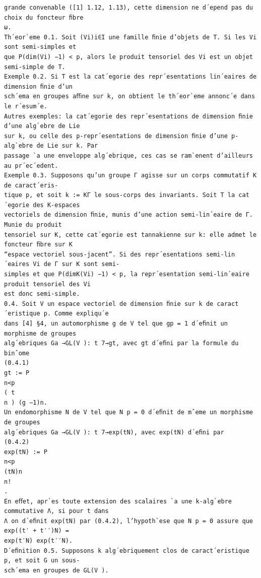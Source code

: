 \documentclass[10pt]{article}
\begin{document}
\begin{verbatim}
grande convenable ([1] 1.12, 1.13), cette dimension ne d´epend pas du choix du foncteur ﬁbre
ω.
Th´eor`eme 0.1. Soit (Vi)i∈I une famille ﬁnie d’objets de T. Si les Vi sont semi-simples et
que P(dim(Vi) −1) < p, alors le produit tensoriel des Vi est un objet semi-simple de T.
Exemple 0.2. Si T est la cat´egorie des repr´esentations lin´eaires de dimension ﬁnie d’un
sch´ema en groupes aﬃne sur k, on obtient le th´eor`eme annonc´e dans le r´esum´e.
Autres exemples: la cat´egorie des repr´esentations de dimension ﬁnie d’une alg`ebre de Lie
sur k, ou celle des p-repr´esentations de dimension ﬁnie d’une p-alg`ebre de Lie sur k. Par
passage `a une enveloppe alg´ebrique, ces cas se ram`enent d’ailleurs au pr´ec´edent.
Exemple 0.3. Supposons qu’un groupe Γ agisse sur un corps commutatif K de caract´eris-
tique p, et soit k := KΓ le sous-corps des invariants. Soit T la cat´egorie des K-espaces
vectoriels de dimension ﬁnie, munis d’une action semi-lin´eaire de Γ.
Munie du produit
tensoriel sur K, cette cat´egorie est tannakienne sur k: elle admet le foncteur ﬁbre sur K
“espace vectoriel sous-jacent”. Si des repr´esentations semi-lin´eaires Vi de Γ sur K sont semi-
simples et que P(dimK(Vi) −1) < p, la repr´esentation semi-lin´eaire produit tensoriel des Vi
est donc semi-simple.
0.4. Soit V un espace vectoriel de dimension ﬁnie sur k de caract´eristique p. Comme expliqu´e
dans [4] §4, un automorphisme g de V tel que gp = 1 d´eﬁnit un morphisme de groupes
alg´ebriques Ga →GL(V ): t 7→gt, avec gt d´eﬁni par la formule du binˆome
(0.4.1)
gt := P
n<p
( t
n ) (g −1)n.
Un endomorphisme N de V tel que N p = 0 d´eﬁnit de mˆeme un morphisme de groupes
alg´ebriques Ga →GL(V ): t 7→exp(tN), avec exp(tN) d´eﬁni par
(0.4.2)
exp(tN) := P
n<p
(tN)n
n!
.
En eﬀet, apr`es toute extension des scalaires `a une k-alg`ebre commutative Λ, si pour t dans
Λ on d´eﬁnit exp(tN) par (0.4.2), l’hypoth`ese que N p = 0 assure que exp((t′ + t′′)N) =
exp(t′N) exp(t′′N).
D´eﬁnition 0.5. Supposons k alg´ebriquement clos de caract´eristique p, et soit G un sous-
sch´ema en groupes de GL(V ).


\end{verbatim}
\end{document}
